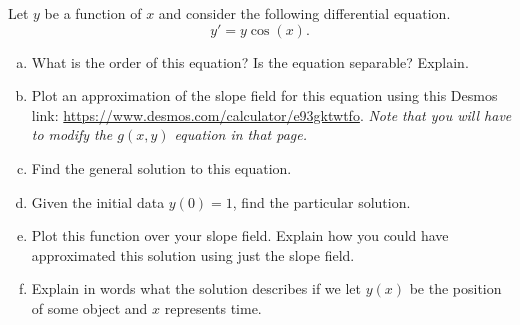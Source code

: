 \documentclass[12pt]{article} %
\begin{document}
\newpage
\begin{problem}
Let $y$ be a function of $x$ and consider the following differential equation.
\[
y' = y\cos(x).
\]
\begin{enumerate}[(a)]
    \item What is the order of this equation? Is the equation separable? Explain.
    \item Plot an approximation of the slope field for this equation using this Desmos link: \url{https://www.desmos.com/calculator/e93gktwtfo}. \emph{Note that you will have to modify the $g(x,y)$ equation in that page.}
    \item Find the general solution to this equation.
    \item Given the initial data $y(0)=1$, find the particular solution.
    \item Plot this function over your slope field. Explain how you could have approximated this solution using just the slope field.
    \item Explain in words what the solution describes if we let $y(x)$ be the position of some object and $x$ represents time.
\end{enumerate}
\end{problem}
\end{document}
